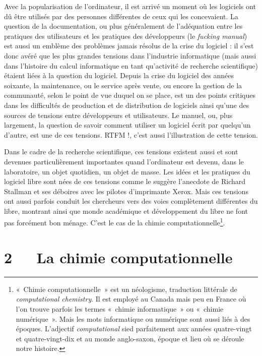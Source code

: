 \documentclass{FramateX}
\begin{document}
\begin{refsection}
Avec la popularisation de l'ordinateur, il est arrivé
un moment où les logiciels ont dû être utilisés par des personnes
différentes de ceux qui les concevaient. La question de la
documentation, ou plus généralement de l'adéquation
entre les pratiques des utilisateurs et les pratiques des développeurs
(le \textit{fucking manual}) est aussi un emblème des problèmes
jamais résolus de la crise du logiciel : il s'est donc
avéré que les plus grandes tensions dans l'industrie
informatique (mais aussi dans l'histoire du calcul
informatique en tant qu'activité de recherche
scientifique) étaient liées à la question du logiciel. Depuis la crise
du logiciel des années soixante, la maintenance, ou le service après
vente, ou encore la gestion de la communauté, selon le point de vue
duquel on se place, est un des points critiques dans les difficultés de
production et de distribution de logiciels ainsi
qu'une des sources de tensions entre développeurs et
utilisateurs. Le manuel, ou, plus largement, la question de savoir
comment utiliser un logiciel écrit par quelqu'un
d'autre, est une de ces tensions. RTFM !,
c'est aussi l'illustration de cette
tension.

Dans le cadre de la recherche scientifique, ces tensions existent aussi
et sont devenues particulièrement importantes quand
l'ordinateur est devenu, dans le laboratoire, un objet
quotidien, un objet de masse. Les idées et les pratiques du logiciel
libre sont nées de ces tensions comme le suggère
l'anecdote de Richard Stallman et ses déboires avec
les pilotes d'imprimante Xerox. Mais ces tensions ont
aussi parfois conduit les chercheurs vers des voies complètement
différentes du libre, montrant ainsi que monde académique et
développement du libre ne font pas forcément bon ménage.
C'est le cas de la chimie
computationnelle\footnote{«~Chimie computationnelle~» est un
néologisme, traduction littérale de \textit{computational
chemistry}. Il est employé au Canada mais peu en France où
l'on trouve parfois les termes «~chimie informatique~»
ou «~chimie numérique~». Mais les mots informatique ou numérique sont
aussi liés à des époques. L'adjectif
\textit{computational} sied parfaitement aux
années quatre-vingt et quatre-vingt-dix et au monde anglo-saxon, époque
et lieu où se déroule notre histoire.}. 

\section*{2~~~La chimie computationnelle}
{}


\end{refsection}
\end{document}
